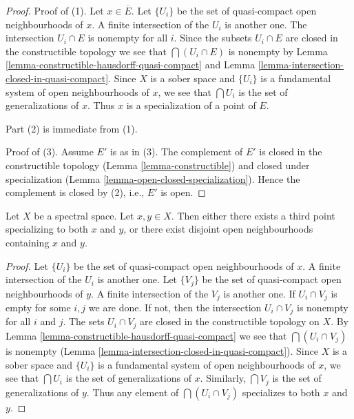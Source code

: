 \begin{proof}
Proof of (1). Let $x \in \overline{E}$. Let $\{U_i\}$ be the set of
quasi-compact open neighbourhoods of $x$. A finite intersection of the
$U_i$ is another one. The intersection $U_i \cap E$ is nonempty for all
$i$. Since the subsets $U_i \cap E$ are closed in the constructible topology
we see that $\bigcap (U_i \cap E)$ is nonempty by
Lemma \ref{lemma-constructible-hausdorff-quasi-compact} and
Lemma \ref{lemma-intersection-closed-in-quasi-compact}.
Since $X$ is a sober space and $\{U_i\}$ is a
fundamental system of open neighbourhoods of $x$, we see that
$\bigcap U_i$ is the set of generalizations of $x$. Thus
$x$ is a specialization of a point of $E$.

\medskip\noindent
Part (2) is immediate from (1).

\medskip\noindent
Proof of (3). Assume $E'$ is as in (3). The complement of $E'$ is closed
in the constructible topology (Lemma \ref{lemma-constructible})
and closed under specialization
(Lemma \ref{lemma-open-closed-specialization}).
Hence the complement is closed by (2), i.e., $E'$ is open.
\end{proof}

\begin{lemma}
\label{lemma-two-points}
Let $X$ be a spectral space. Let $x, y \in X$. Then either there exists
a third point specializing to both $x$ and $y$, or there exist disjoint
open neighbourhoods containing $x$ and $y$.
\end{lemma}

\begin{proof}
Let $\{U_i\}$ be the set of quasi-compact open neighbourhoods of $x$.
A finite intersection of the $U_i$ is another one.
Let $\{V_j\}$ be the set of quasi-compact open neighbourhoods of $y$.
A finite intersection of the $V_j$ is another one.
If $U_i \cap V_j$ is empty for some $i, j$ we are done.
If not, then the intersection $U_i \cap V_j$ is nonempty
for all $i$ and $j$. The sets $U_i \cap V_j$ are closed in the constructible
topology on $X$. By
Lemma \ref{lemma-constructible-hausdorff-quasi-compact}
we see that $\bigcap (U_i \cap V_j)$ is nonempty
(Lemma \ref{lemma-intersection-closed-in-quasi-compact}).
Since $X$ is a sober space and $\{U_i\}$ is a
fundamental system of open neighbourhoods of $x$, we see that
$\bigcap U_i$ is the set of generalizations of $x$.
Similarly, $\bigcap V_j$ is the set of generalizations of $y$.
Thus any element of $\bigcap (U_i \cap V_j)$ specializes to both
$x$ and $y$.
\end{proof}

